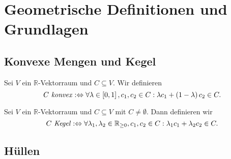 \documentclass[10p,a4paper,BCOR = 12mm, DIV=15]{scrbook}
\begin{document}
\section{Geometrische Definitionen und Grundlagen}

\subsection{Konvexe Mengen und Kegel}


\begin{Def}
Sei $V$ ein $\mathbb{R}$-Vektorraum und $C \subseteq V$. Wir definieren
\begin{displaymath}
C\textnormal{ \emph{konvex}} :\Leftrightarrow \forall \lambda \in \left[0, 1\right], c_1, c_2 \in C: \lambda c_1 + \left(1-\lambda\right) c_2 \in C.
\end{displaymath}
\end{Def}

\begin{Def}
Sei $V$ ein $\mathbb{R}$-Vektorraum und $C \subseteq V$ mit $C \neq \emptyset$. Dann definieren wir
\begin{displaymath}
C\textnormal{ \emph{Kegel}} :\Leftrightarrow \forall \lambda_1, \lambda_2 \in \mathbb{R}_{\geq 0}, c_1, c_2 \in C: \lambda_1 c_1 + \lambda_2 c_2 \in C.
\end{displaymath}
\end{Def}

\subsection{Hüllen}
\end{document}
